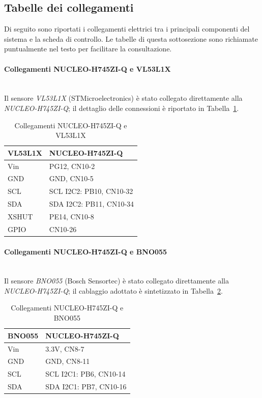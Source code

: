 \documentclass[11pt]{report}
\begin{document}
	\clearpage
	\subsection{Tabelle dei collegamenti}
	Di seguito sono riportati i collegamenti elettrici tra i principali componenti del sistema e la scheda di controllo. Le tabelle di questa sottosezione sono richiamate puntualmente nel testo per facilitare la consultazione.
	
	\paragraph{Collegamenti NUCLEO-H745ZI-Q e VL53L1X}\mbox{}\\
	Il sensore \textit{VL53L1X} (STMicroelectronics) è stato collegato direttamente alla \textit{NUCLEO-H745ZI-Q}; il dettaglio delle connessioni è riportato in Tabella~\ref{tab:collegamenti-vl53l1x}.
	\begin{table}[H]
		\centering
		\begin{tabular}{l l}
			\toprule
			\textbf{VL53L1X} & \textbf{NUCLEO-H745ZI-Q} \\
			\midrule
			Vin & PG12, CN10-2 \\
			GND & GND, CN10-5 \\
			SCL & SCL I2C2: PB10, CN10-32 \\
			SDA & SDA I2C2: PB11, CN10-34 \\
			XSHUT & PE14, CN10-8 \\
			GPIO & CN10-26 \\
			\bottomrule
		\end{tabular}
		\caption{Collegamenti NUCLEO-H745ZI-Q e VL53L1X}
		\label{tab:collegamenti-vl53l1x}
	\end{table}
	
	\paragraph{Collegamenti NUCLEO-H745ZI-Q e BNO055}\mbox{}\\
	Il sensore \textit{BNO055} (Bosch Sensortec) è stato collegato direttamente alla \textit{NUCLEO-H745ZI-Q}; il cablaggio adottato è sintetizzato in Tabella~\ref{tab:collegamenti-bno055}.
	\begin{table}[H]
		\centering
		\begin{tabular}{l l}
			\toprule
			\textbf{BNO055} & \textbf{NUCLEO-H745ZI-Q} \\
			\midrule
			Vin & 3.3V, CN8-7 \\
			GND & GND, CN8-11 \\
			SCL & SCL I2C1: PB6, CN10-14 \\
			SDA & SDA I2C1: PB7, CN10-16 \\
			\bottomrule
		\end{tabular}
		\caption{Collegamenti NUCLEO-H745ZI-Q e BNO055}
		\label{tab:collegamenti-bno055}
	\end{table}
	
\end{document}
